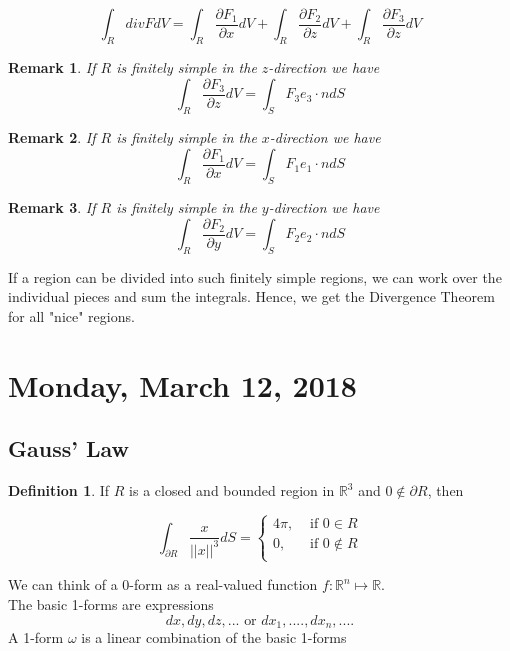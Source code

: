 \documentclass[12pt]{article}
\theoremstyle{plain}
\newtheorem*{remark}{Remark}
\theoremstyle{definition}
\newtheorem{definition}[theorem]{Definition}
\begin{document}
$$\int_R div F dV = \int_R\frac{\partial F_1}{\partial x}dV + \int_R\frac{\partial F_2}{\partial z}dV + \int_R\frac{\partial F_3}{\partial z}dV$$

\begin{remark}
    If $R$ is finitely simple in the $z$-direction we have
    $$\int_R \frac{\partial F_3}{\partial z} dV = \int_S F_3 e_3 \cdot n dS$$
\end{remark}

\begin{remark}
    If $R$ is finitely simple in the $x$-direction we have
    $$\int_R \frac{\partial F_1}{\partial x} dV = \int_S F_1 e_1 \cdot n dS$$
\end{remark}

\begin{remark}
    If $R$ is finitely simple in the $y$-direction we have
    $$\int_R \frac{\partial F_2}{\partial y} dV = \int_S F_2 e_2 \cdot n dS$$
\end{remark}

If a region can be divided into such finitely simple regions, we can work over the individual pieces and sum the integrals. Hence, we get the Divergence Theorem for all "nice" regions.

\newpage

\section{Monday, March 12, 2018}

\subsection{Gauss' Law}

\begin{definition}
    If $R$ is a closed and bounded region in $\mathbb{R}^3$ and $0 \not\in \partial R$, then

$$\int_{\partial R} \frac{x}{||x||^3} dS = \begin{cases}
4\pi, &\text{ if } 0 \in R\\
0, &\text{ if } 0 \not\in R\\
\end{cases}$$
\end{definition}

We can think of a 0-form as a real-valued function $f:\mathbb{R}^n\mapsto \mathbb{R}$.\\
The basic 1-forms are expressions
$$dx, dy, dz,... \text{ or } dx_1, ...., dx_n,....$$
A 1-form $\omega$ is a linear combination of the basic 1-forms
\end{document}
